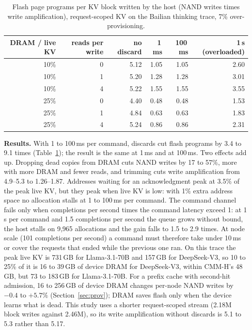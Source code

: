 \documentclass[acmsmall,screen,review]{acmart}
\begin{document}
\begin{table}[t]
\caption{Flash page programs per KV block written by the host (NAND writes times write
amplification), request-scoped KV on the Bailian thinking trace, 7\% over-provisioning.}
\label{tab:discard}
\small
\begin{tabular}{rrrrrr}
\toprule
DRAM / live KV & reads per write & no discard & 1\,ms & 100\,ms & 1\,s (overloaded) \\
\midrule
10\% & 0 & 5.12 & 1.05 & 1.05 & 2.60 \\
10\% & 1 & 5.20 & 1.28 & 1.28 & 3.01 \\
10\% & 4 & 5.22 & 1.55 & 1.55 & 3.55 \\
25\% & 0 & 4.40 & 0.48 & 0.48 & 1.53 \\
25\% & 1 & 4.84 & 0.63 & 0.63 & 1.83 \\
25\% & 4 & 5.24 & 0.86 & 0.86 & 2.31 \\
\bottomrule
\end{tabular}
\end{table}

\textbf{Results.} With 1 to 100\,ms per command, discards cut flash programs by 3.4 to 9.1 times
(Table~\ref{tab:discard}); the result is the same at 1\,ms and at 100\,ms. Two effects add up.
Dropping dead copies from DRAM cuts NAND writes by 17 to 57\%, more with more DRAM and fewer reads,
and trimming cuts write amplification from 4.9--5.3 to 1.26--1.87. Addresses waiting for an
acknowledgment peak at 3.5\% of the peak live KV, but they peak when live KV is low: with 1\% extra
address space no allocation stalls at 1 to 100\,ms per command. The command channel fails only when completions per second times the command latency
exceed 1: at 1\,s per command and 1.5 completions per second the queue grows without bound, the
host stalls on 9,965 allocations and the gain falls to 1.5 to 2.9 times. At node scale (101 completions per second) a
command must therefore take under 10\,ms or cover the requests that ended while the previous one ran. On this trace the peak live KV
is 731\,GB for Llama-3.1-70B and 157\,GB for DeepSeek-V3, so 10 to 25\% of it is 16 to 39\,GB of
device DRAM for DeepSeek-V3, within CMM-H's 48\,GB, but 73 to 183\,GB for Llama-3.1-70B. For a
prefix cache with second-hit admission, 16 to 256\,GB of device DRAM changes per-node NAND writes by
$-0.4$ to $+5.7\%$ (Section~\ref{sec:prov}); DRAM saves flash only when the device learns what is
dead. This study uses a shorter request-scoped stream (2.18M block writes against 2.46M), so its
write amplification without discards is 5.1 to 5.3 rather than 5.17.
\end{document}
